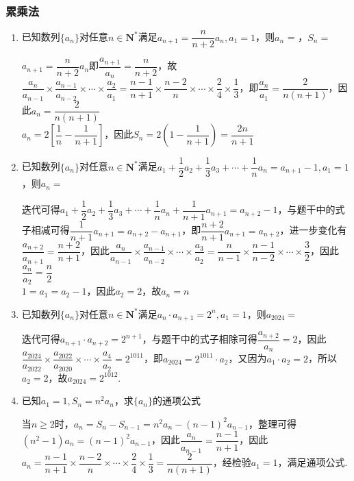 \subsubsection*{累乘法}
\begin{enumerate}
    \item 已知数列$\{a_n\}$对任意$n \in \mathbf{N^*}$满足$a_{n+1} = \dfrac{n}{n+2}a_n, a_1 = 1$，则$a_n$ = ，$S_n = $
    \begin{jieda}
        $a_{n+1} = \dfrac{n}{n+2}a_n$即$\dfrac{a_{n+1}}{a_n} = \dfrac{n}{n+2}$，故$\dfrac{a_n}{a_{n-1}} \times \dfrac{a_{n-1}}{a_{n-2}} \times \cdots \times \dfrac{a_2}{a_1} = \dfrac{n-1}{n+1} \times \dfrac{n-2}{n} \times \cdots \times \dfrac{2}{4} \times \dfrac{1}{3}$，即$\dfrac{a_n}{a_1} = \dfrac{2}{n(n+1)}$，因此$a_n = \dfrac{2}{n(n+1)}$ \\
        $a_n = 2\left[\dfrac{1}{n} - \dfrac{1}{n+1}\right]$，因此$S_n = 2\left(1-\dfrac{1}{n+1}\right) = \dfrac{2n}{n+1}$
    \end{jieda}
    
    \item 已知数列$\{a_n\}$对任意$n \in \mathbf{N^*}$满足$a_1+\dfrac{1}{2}a_2+\dfrac{1}{3}a_3+\cdots+\dfrac{1}{n}a_n = a_{n+1}-1, a_1 = 1$，则$a_n = $
    \begin{jieda}
        迭代可得$a_1+\dfrac{1}{2}a_2+\dfrac{1}{3}a_3+\cdots+\dfrac{1}{n}a_n+\dfrac{1}{n+1}a_{n+1} = a_{n+2}-1$，与题干中的式子相减可得$\dfrac{1}{n+1}a_{n+1} = a_{n+2} - a_{n+1}$，即$\dfrac{n+2}{n+1}a_{n+1} = a_{n+2}$，进一步变化有$\dfrac{a_{n+2}}{a_{n+1}} = \dfrac{n+2}{n+1}$，因此$\dfrac{a_n}{a_{n-1}} \times \dfrac{a_{n-1}}{a_{n-2}} \times \cdots \times \dfrac{a_3}{a_2} = \dfrac{n}{n-1} \times \dfrac{n-1}{n-2} \times \cdots \times \dfrac{3}{2}$，因此$\dfrac{a_n}{a_2} = \dfrac{n}{2}$ \\
        $1 = a_1 = a_2 - 1$，因此$a_2 = 2$，故$a_n = n$
    \end{jieda}

    \item 已知数列$\{a_n\}$对任意$n \in \mathbf{N^*}$满足$a_n \cdot a_{n+1} = 2^n, a_1 = 1$，则$a_{2024} = $
    \begin{jieda}
         迭代可得$a_{n+1}\cdot a_{n+2} = 2^{n+1}$，与题干中的式子相除可得$\dfrac{a_{n+2}}{a_n} = 2$，因此$\dfrac{a_{2024}}{a_{2022}} \times \dfrac{a_{2022}}{a_{2020}} \times \cdots \times \dfrac{a_4}{a_2} = 2^{1011}$，即$a_{2024} = 2^{1011} \cdot a_2$，又因为$a_1 \cdot a_2 = 2$，所以$a_2 = 2$，故$a_{2024} = 2^{1012}$.
    \end{jieda}
    \item 已知$a_1 = 1, S_n = n^2a_n$，求$\{a_n\}$的通项公式
    \begin{jieda}
        当$n \geq 2$时，$a_n = S_n - S_{n-1} = n^2a_n - (n-1)^2a_{n-1}$，整理可得$(n^2-1)a_n = (n-1)^2a_{n-1}$，因此$\dfrac{a_n}{a_{n-1}} = \dfrac{n-1}{n+1}$，因此$a_n = \dfrac{n-1}{n+1} \times \dfrac{n-2}{n} \times \cdots \times \dfrac{2}{4} \times \dfrac{1}{3} = \dfrac{2}{n(n+1)}$，经检验$a_1 = 1$，满足通项公式.
    \end{jieda}
\end{enumerate}
